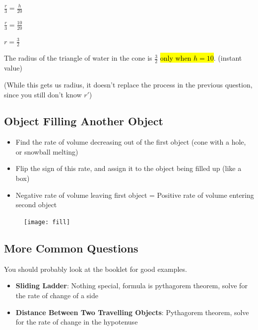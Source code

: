 \documentclass[a4paper,12pt]{article}
\begin{document}
$\frac{r}{3} = \frac{h}{20}$

$\frac{r}{3} = \frac{10}{20}$

$r = \frac{3}{2}$

The radius of the triangle of water in the cone is $\frac{3}{2}$ \hl{only when $h = 10$}. (instant value)

(While this gets us radius, it doesn't replace the process in the previous question, since you still don't know $r'$)

\pagebreak

\subsection{Object Filling Another Object}
\begin{itemize}
    \item{Find the rate of volume decreasing out of the first object (cone with a hole, or snowball melting)}
    \item{Flip the sign of this rate, and assign it to the object being filled up (like a box)}
    \item{Negative rate of volume leaving first object = Positive rate of volume entering second object}
\end{itemize}

\begin{figure}[H]
    \centering
    \texttt{[image: fill]}
\end{figure}

\pagebreak

\subsection{More Common Questions}
You should probably look at the booklet for good examples.
\begin{itemize}
    \item{\textbf{Sliding Ladder}: Nothing special, formula is pythagorem theorem, solve for the rate of change of a side}
    \item{\textbf{Distance Between Two Travelling Objects}: Pythagorem theorem, solve for the rate of change in the hypotenuse}
\end{itemize}
\end{document}
